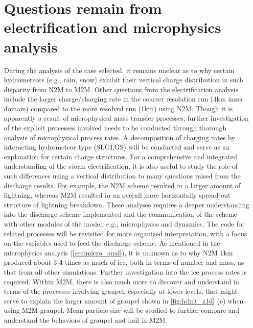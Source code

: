 \section{Questions remain from electrification and microphysics analysis}
During the analysis of the case selected, it remains unclear as to why certain hydrometeors (e.g., rain, snow) exhibit their vertical charge distribution in such disparity from N2M to M2M. Other questions from the electrification analysis include the larger charge/charging rate in the coarser resolution run (4km inner domain) compared to the more resolved run (1km) using N2M. Though it is apparently a result of microphysical mass transfer processes, further investigation of the explicit processes involved needs to be conducted through thorough analysis of microphysical process rates. A decomposition of charging rates by interacting hydrometeor type (SI,GI,GS) will be conducted and serve as an explanation for certain charge structures. For a comprehensive and integrated understanding of the storm electrification, it is also useful to study the role of such differences using a vertical distribution to many questions raised from the discharge results. For example, the N2M scheme resulted in a  larger amount of lightning, whereas M2M resulted in an overall more horizontally spread-out structure of lightning breakdown. These analyses requires a deeper understanding into the discharge scheme implemented and the communication of the scheme with other modules of the model, e.g., microphysics and dynamics. The code for related processes will be revisited for more organized interpretation, with a focus on the variables used to feed the discharge scheme. As mentioned in the microphysics analysis (\ref{sec:micro_anal}), it is unknown as to why N2M 1km produced about 3-4 times as much of ice, both in terms of number and mass, as that from all other simulations. Further investigation into the ice process rates is required. Within M2M, there is also much more to discover and understand in terms of the processes involving graupel, especially at lower levels, that might serve to explain the larger amount of graupel shown in \ref{fig:hdmt_z1d} (e) when using M2M-graupel. Mean particle size will be studied to further compare and understand the behaviors of graupel and hail in M2M.